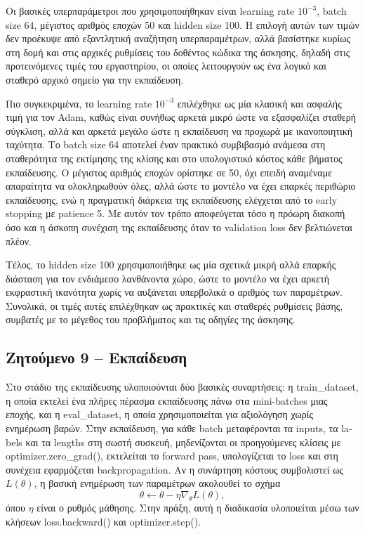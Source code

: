 \documentclass[11pt,a4paper]{article}
\begin{document}
Οι βασικές υπερπαράμετροι που χρησιμοποιήθηκαν είναι \textlatin{learning rate} \(10^{-3}\), \textlatin{batch size} 64, μέγιστος αριθμός εποχών 
50 και \textlatin{hidden size} 100. Η επιλογή αυτών των τιμών δεν προέκυψε από εξαντλητική αναζήτηση υπερπαραμέτρων, αλλά βασίστηκε κυρίως στη 
δομή και στις αρχικές ρυθμίσεις του δοθέντος κώδικα της άσκησης, δηλαδή στις προτεινόμενες τιμές του εργαστηρίου, οι οποίες λειτουργούν ως ένα λογικό 
και σταθερό αρχικό σημείο για την εκπαίδευση.

Πιο συγκεκριμένα, το \textlatin{learning rate} \(10^{-3}\) επιλέχθηκε ως μία κλασική και ασφαλής τιμή για τον \textlatin{Adam}, καθώς είναι συνήθως 
αρκετά μικρό ώστε να εξασφαλίζει σταθερή σύγκλιση, αλλά και αρκετά μεγάλο ώστε η εκπαίδευση να προχωρά με ικανοποιητική ταχύτητα. 
Το \textlatin{batch size} 64 αποτελεί έναν πρακτικό συμβιβασμό ανάμεσα στη σταθερότητα της εκτίμησης της κλίσης και στο υπολογιστικό κόστος κάθε 
βήματος εκπαίδευσης. Ο μέγιστος αριθμός εποχών ορίστηκε σε 50, όχι επειδή αναμέναμε απαραίτητα να ολοκληρωθούν όλες, αλλά ώστε το μοντέλο να έχει 
επαρκές περιθώριο εκπαίδευσης, ενώ η πραγματική διάρκεια της εκπαίδευσης ελέγχεται από το \textlatin{early stopping} με \textlatin{patience} 5. 
Με αυτόν τον τρόπο αποφεύγεται τόσο η πρόωρη διακοπή όσο και η άσκοπη συνέχιση της εκπαίδευσης όταν το \textlatin{validation loss} δεν βελτιώνεται 
πλέον.

Τέλος, το \textlatin{hidden size} 100 χρησιμοποιήθηκε ως μία σχετικά μικρή αλλά επαρκής διάσταση για τον ενδιάμεσο λανθάνοντα χώρο, ώστε το μοντέλο 
να έχει αρκετή εκφραστική ικανότητα χωρίς να αυξάνεται υπερβολικά ο αριθμός των παραμέτρων. Συνολικά, οι τιμές αυτές επιλέχθηκαν ως πρακτικές και 
σταθερές ρυθμίσεις βάσης, συμβατές με το μέγεθος του προβλήματος και τις οδηγίες της άσκησης.

\subsection*{Ζητούμενο 9 -- Εκπαίδευση}


Στο στάδιο της εκπαίδευσης υλοποιούνται δύο βασικές συναρτήσεις: η \textlatin{train\_dataset}, η οποία εκτελεί ένα πλήρες πέρασμα εκπαίδευσης 
πάνω στα \textlatin{mini-batches} μιας εποχής, και η \textlatin{eval\_dataset}, η οποία χρησιμοποιείται για αξιολόγηση χωρίς ενημέρωση βαρών. 
Στην εκπαίδευση, για κάθε \textlatin{batch} μεταφέρονται τα \textlatin{inputs}, τα \textlatin{labels} και τα \textlatin{lengths} στη σωστή συσκευή, 
μηδενίζονται οι προηγούμενες κλίσεις με \textlatin{optimizer.zero\_grad()}, εκτελείται το \textlatin{forward pass}, υπολογίζεται το \textlatin{loss} 
και στη συνέχεια εφαρμόζεται \textlatin{backpropagation}. Αν η συνάρτηση κόστους συμβολιστεί ως \(L(\theta)\), η βασική ενημέρωση των παραμέτρων 
ακολουθεί το σχήμα
\[
\theta \leftarrow \theta - \eta \nabla_\theta L(\theta),
\]
όπου \(\eta\) είναι ο ρυθμός μάθησης. Στην πράξη, αυτή η διαδικασία υλοποιείται μέσω των κλήσεων \textlatin{loss.backward()} και 
\textlatin{optimizer.step()}.
\end{document}

